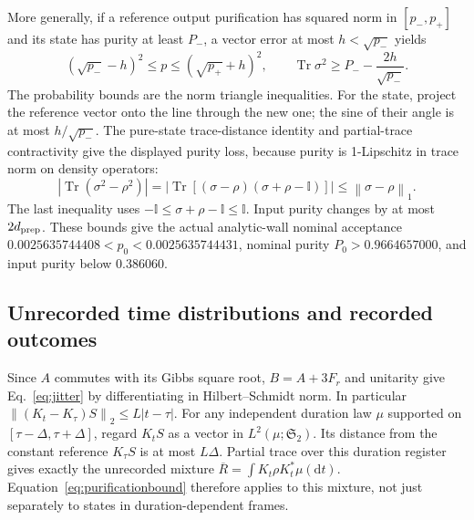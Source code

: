 \documentclass[aps,pra,reprint,superscriptaddress,longbibliography]{revtex4-2}
\newcommand{\Tr}{\operatorname{Tr}}
\newcommand{\dd}{\mathrm d}
\newcommand{\id}{\mathbb I}
\newcommand{\norm}[1]{\left\lVert#1\right\rVert}
\begin{document}
More generally, if a reference output purification has squared norm
in $[p_-,p_+]$ and its state has purity at least $P_-$, a vector
error at most $h<\sqrt{p_-}$ yields
\begin{equation}
 (\sqrt{p_-}-h)^2\le p\le(\sqrt{p_+}+h)^2,
 \qquad \Tr\sigma^2\ge P_- -\frac{2h}{\sqrt{p_-}}.            \label{eq:purificationbound}
\end{equation}
The probability bounds are the norm triangle inequalities. For the
state, project the reference vector onto the line through the new
one; the sine of their angle is at most $h/\sqrt{p_-}$.
The pure-state trace-distance identity and partial-trace
contractivity give the displayed purity loss, because purity is
1-Lipschitz in trace norm on density operators:
\begin{equation}
 |\Tr(\sigma^2-\rho^2)|
 =|\Tr[(\sigma-\rho)(\sigma+\rho-\id)]|
 \le\norm{\sigma-\rho}_1.
\end{equation}
The last inequality uses $-\id\le\sigma+\rho-\id\le\id$.
Input purity changes by at most $2d_{\rm prep}$.
These bounds give the actual analytic-wall nominal acceptance
$0.0025635744408<p_0<0.0025635744431$, nominal purity
$P_0>0.9664657000$, and input purity below $0.386060$.

\subsection{Unrecorded time distributions and recorded outcomes}

Since $A$ commutes with its Gibbs square root,
$B=A+3F_r$ and unitarity give Eq.~\eqref{eq:jitter} by
differentiating in Hilbert--Schmidt norm. In particular
$\norm{(K_t-K_\tau)S}_2\le L|t-\tau|$.
For any independent duration law $\mu$ supported on
$[\tau-\Delta,\tau+\Delta]$, regard $K_tS$ as a vector in
$L^2(\mu;\mathfrak S_2)$. Its distance from the constant
reference $K_\tau S$ is at most $L\Delta$. Partial trace over
this duration register gives exactly the unrecorded mixture
$\overline R=\int K_t\rho K_t^*\mu(\dd t)$.
Equation~\eqref{eq:purificationbound} therefore applies to this
mixture, not just separately to states in duration-dependent frames.
\end{document}
